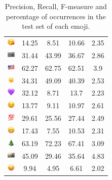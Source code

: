 \documentclass{article}
\begin{document}
\begin{table}
\begin{tabular}{|c|ccc|c|}
\includegraphics[height=0.37cm,width=0.37cm]{img/face_blowing_a_kiss.png} & 14.25 & 8.51 & 10.66 & 2.35\\ 
\includegraphics[height=0.37cm,width=0.37cm]{img/camera.png} & 31.44 & 43.99 & 36.67 & 2.86\\ 
\includegraphics[height=0.37cm,width=0.37cm]{img/United_States.png} & 62.27 & 62.75 & 62.51 & 3.9\\ 
\includegraphics[height=0.37cm,width=0.37cm]{img/sun.png} & 34.31 & 49.09 & 40.39 & 2.53\\ 
\includegraphics[height=0.37cm,width=0.37cm]{img/purple_heart.png} & 32.12 & 8.71 & 13.7 & 2.23\\ 
\includegraphics[height=0.37cm,width=0.37cm]{img/winking_face.png} & 13.77 & 9.11 & 10.97 & 2.61\\ 
\includegraphics[height=0.37cm,width=0.37cm]{img/hundred_points.png} & 29.61 & 25.56 & 27.44 & 2.49\\ 
\includegraphics[height=0.37cm,width=0.37cm]{img/beaming_face_with_smiling_eyes.png} & 17.43 & 7.55 & 10.53 & 2.31\\ 
\includegraphics[height=0.37cm,width=0.37cm]{img/Christmas_tree.png} & 63.19 & 72.23 & 67.41 & 3.09\\ 
\includegraphics[height=0.37cm,width=0.37cm]{img/camera_with_flash.png} & 45.09 & 29.46 & 35.64 & 4.83\\ 
\includegraphics[height=0.37cm,width=0.37cm]{img/winking_face_with_tongue.png} & 9.94 & 4.95 & 6.61 & 2.02\\ 

\hline
\end{tabular}
\caption{\label{table:emoji_detailed} Precision, Recall, F-measure and percentage of occurrences in the test set of each emoji.}
\end{table}
\end{document}
